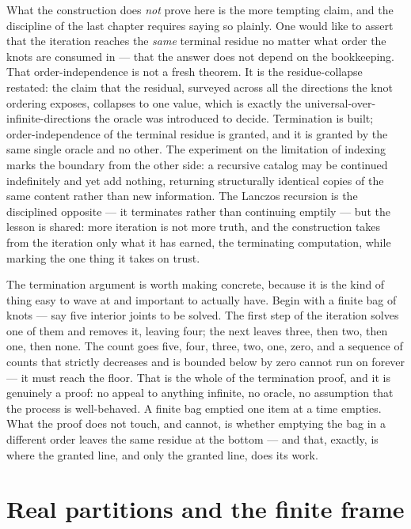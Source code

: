 What the construction does \emph{not} prove here is the more tempting claim, and the discipline of the
last chapter requires saying so plainly. One would like to assert that the iteration reaches the
\emph{same} terminal residue no matter what order the knots are consumed in --- that the answer does
not depend on the bookkeeping. That order-independence is not a fresh theorem. It is the
residue-collapse restated: the claim that the residual, surveyed across all the directions the knot
ordering exposes, collapses to one value, which is exactly the universal-over-infinite-directions the
oracle was introduced to decide. Termination is built; order-independence of the terminal residue is
granted, and it is granted by the same single oracle and no other. The experiment on the limitation of
indexing marks the boundary from the other side: a recursive catalog may be continued indefinitely and
yet add nothing, returning structurally identical copies of the same content rather than new
information. The Lanczos recursion is the disciplined opposite --- it terminates rather than continuing
emptily --- but the lesson is shared: more iteration is not more truth, and the construction takes from
the iteration only what it has earned, the terminating computation, while marking the one thing it
takes on trust.

The termination argument is worth making concrete, because it is the kind of thing easy to wave at and
important to actually have. Begin with a finite bag of knots --- say five interior joints to be solved.
The first step of the iteration solves one of them and removes it, leaving four; the next leaves three,
then two, then one, then none. The count goes five, four, three, two, one, zero, and a sequence of
counts that strictly decreases and is bounded below by zero cannot run on forever --- it must reach the
floor. That is the whole of the termination proof, and it is genuinely a proof: no appeal to anything
infinite, no oracle, no assumption that the process is well-behaved. A finite bag emptied one item at a
time empties. What the proof does not touch, and cannot, is whether emptying the bag in a different
order leaves the same residue at the bottom --- and that, exactly, is where the granted line, and only
the granted line, does its work.

\section{Real partitions and the finite frame}
\label{se:real-partitions-and-the-finite-frame}

